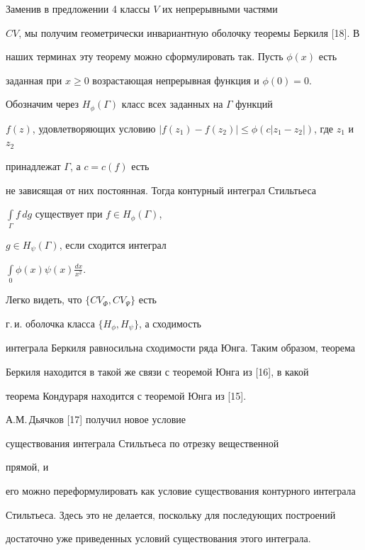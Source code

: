 \begin{note}


Заменив в предложении 4 классы $V$ их непрерывными частями


$CV$, мы получим геометрически инвариантную оболочку теоремы Беркиля [18]. В


наших терминах эту теорему можно сформулировать так. Пусть $\phi (x)$ есть


заданная при $x\ge 0$ возрастающая непрерывная функция и $\phi (0) = 0.$


Обозначим через $H_{\phi}(\Gamma)$ класс всех заданных на $\Gamma$ функций


$f(z)$, удовлетворяющих условию $|f(z_1) - f(z_2)|\le


\phi (c|z_1 - z_2|)$, где $z_{1}$ и $z_{2}$


принадлежат $\Gamma$, а $c = c(f)$ есть


не зависящая от них постоянная. Тогда контурный интеграл Стильтьеса


$\int\limits_{\Gamma}f\,dg$ существует при $f\in H_{\phi}(\Gamma)$,


$g\in H_{\psi}(\Gamma)$, если сходится интеграл


$\int\limits_{0}\phi (x)\psi (x)\frac{dx}{x^2}$.


Легко видеть, что $\{CV_{\Phi}, CV_{\Psi}\}$ есть


г.\,и. оболочка класса $\{H_{\phi}, H_{\psi}\}$, а сходимость


интеграла Беркиля равносильна сходимости ряда Юнга. Таким образом, теорема


Беркиля находится в такой же связи с теоремой Юнга из [16], в какой


теорема Кондураря находится с теоремой Юнга из [15].


\end{note}





\begin{note}


А.М.\,Дьячков [17] получил новое условие


существования интеграла Стильтьеса по отрезку вещественной


прямой, и


его можно переформулировать как условие существования контурного интеграла


Стильтьеса. Здесь это не делается, поскольку для последующих построений


достаточно уже приведенных условий существования этого интеграла.


\end{note}





